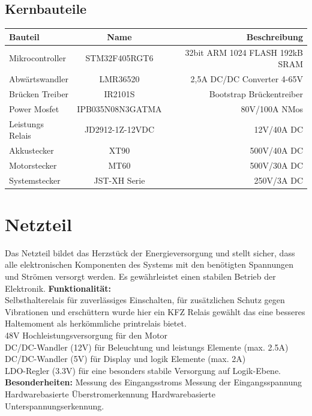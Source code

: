 \documentclass[paper=a4,11pt]{scrreprt}
\begin{document}
\subsection{Kernbauteile}

\begin{tabular}[h]{l|c|r}
\textbf{Bauteil} & \textbf{Name} & \textbf{Beschreibung} \\
\hline
Mikrocontroller & STM32F405RGT6 & 32bit ARM 1024 FLASH 192kB SRAM \\
\hline
Abwärtswandler & LMR36520 & 2,5A DC/DC Converter 4-65V\\
\hline
Brücken Treiber & IR2101S & Bootstrap Brückentreiber\\
\hline
Power Mosfet & IPB035N08N3GATMA & 80V/100A NMos\\  
\hline
Leistungs Relais & JD2912-1Z-12VDC & 12V/40A DC\\
 \hline
Akkustecker & XT90 & 500V/40A DC\\
\hline
Motorstecker & MT60 & 500V/30A DC\\
\hline
Systemstecker & JST-XH Serie & 250V/3A DC\\
\hline
\end{tabular}

\section{Netzteil}
Das Netzteil bildet das Herzstück der Energieversorgung und stellt sicher, dass alle elektronischen Komponenten des Systems mit den benötigten Spannungen und Strömen versorgt werden. Es gewährleistet einen stabilen Betrieb der Elektronik.
\textbf{Funktionalität:}\\
Selbsthalterelais für zuverlässiges Einschalten, für zusätzlichen Schutz gegen Vibrationen und erschüttern wurde hier ein KFZ Relais gewählt das eine besseres Haltemoment als herkömmliche printrelais bietet. \\
48V Hochleistungsversorgung für den Motor\\
DC/DC-Wandler (12V) für Beleuchtung und leistungs Elemente (max. 2.5A)\\
DC/DC-Wandler (5V) für Display und logik Elemente (max. 2A)\\
LDO-Regler (3.3V) für eine besonders stabile Versorgung auf Logik-Ebene.\\
\textbf{Besonderheiten:}
Messung des Eingangsstroms
Messung der Eingangsspannung
Hardwarebasierte Überstromerkennung
Hardwarebasierte Unterspannungserkennung.
\newpage
\end{document}
